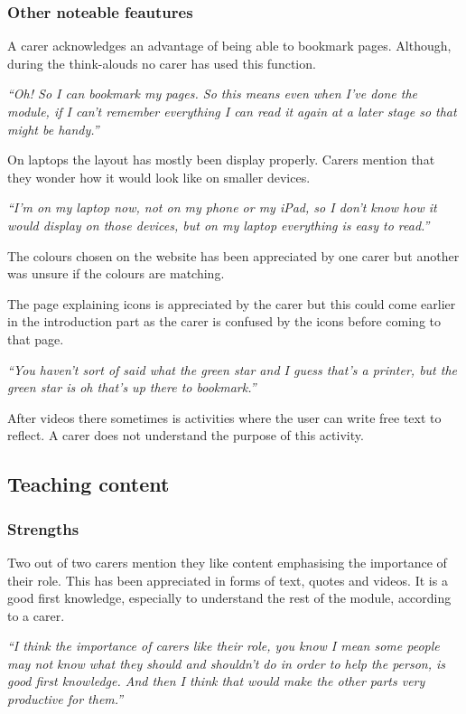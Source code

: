 \documentclass{sigchi}
\begin{document}
\subsubsection{Other noteable feautures}
A carer acknowledges an advantage of being able to bookmark pages. Although, during the think-alouds no carer has used this function. 

\textit{“Oh! So I can bookmark my pages. So this means even when I’ve done the module, if I can’t remember everything I can read it again at a later stage so that might be handy.”}

On laptops the layout has mostly been display properly. Carers mention that they wonder how it would look like on smaller devices. 

\textit{“I’m on my laptop now, not on my phone or my iPad, so I don’t know how it would display on those devices, but on my laptop everything is easy to read.”}

The colours chosen on the website has been appreciated by one carer but another was unsure if the colours are matching. 

The page explaining icons is appreciated by the carer but this could come earlier in the introduction part as the carer is confused by the icons before coming to that page.

\textit{“You haven’t sort of said what the green star and I guess that’s a printer, but the green star is oh that’s up there to bookmark.”}

After videos there sometimes is activities where the user can write free text to reflect. A carer does not understand the purpose of this activity. 

\subsection{Teaching content}
\subsubsection{Strengths}
Two out of two carers mention they like content emphasising the importance of their role. This has been appreciated in forms of text, quotes and videos. It is a good first knowledge, especially to understand the rest of the module, according to a carer.

\textit{“I think the importance of carers like their role, you know I mean some people may not know what they should and shouldn't do in order to help the person, is good first knowledge. And then I think that would make the other parts very productive for them.”}
\end{document}
